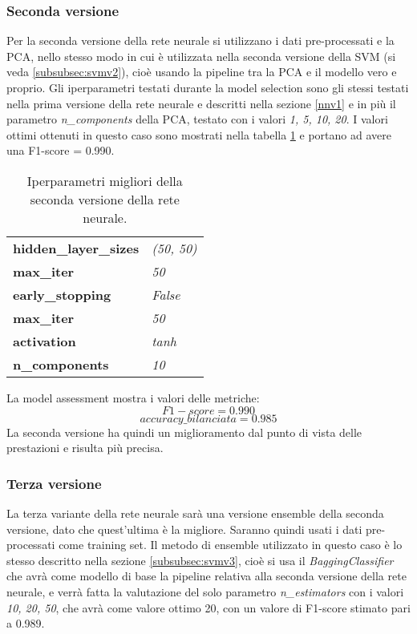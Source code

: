\subsubsection{Seconda versione}\label{nnv2}
Per la seconda versione della rete neurale si utilizzano i dati pre-processati e la PCA, nello stesso modo in cui è utilizzata nella seconda versione della SVM (si veda \ref{subsubsec:svmv2}), cioè usando la pipeline tra la PCA e il modello vero e proprio.  Gli iperparametri testati durante la model selection sono gli stessi testati nella prima versione della rete neurale e descritti nella sezione \ref{nnv1} e in più il parametro \textit{n\_components} della PCA, testato con i valori \textit{1, 5, 10, 20}. I valori ottimi ottenuti in questo caso sono mostrati nella tabella \ref{tab:nnv2} e portano ad avere una F1-score = 0.990.

\begin{table}[h] 
\centering
\begin{tabular}{l l}
\hline
\textbf{hidden\_layer\_sizes} & \textit{(50, 50)}\\
\textbf{max\_iter} & \textit{50}\\
\textbf{early\_stopping} & \textit{False}\\
\textbf{max\_iter} & \textit{50}\\
\textbf{activation} & \textit{tanh}\\
\textbf{n\_components} & \textit{10}\\
\hline
\end{tabular}
\caption{Iperparametri migliori della seconda versione della rete neurale.}
\label{tab:nnv2}
\end{table}

La model assessment mostra i valori delle metriche:
$$F1-score = 0.990$$
$$accuracy\_bilanciata = 0.985$$
La seconda versione ha quindi un miglioramento dal punto di vista delle prestazioni e risulta più precisa.

\subsubsection{Terza versione}\label{nnv3}
La terza variante della rete neurale sarà una versione ensemble della seconda versione, dato che quest'ultima è la migliore. Saranno quindi usati i dati pre-processati come training set. Il metodo di ensemble utilizzato in questo caso è lo stesso descritto nella sezione \ref{subsubsec:svmv3}, cioè si usa il \textit{BaggingClassifier} che avrà come modello di base la pipeline relativa alla seconda versione della rete neurale, e verrà fatta la valutazione del solo parametro \textit{n\_estimators} con i valori \textit{10, 20, 50}, che avrà come valore ottimo 20, con un valore di F1-score stimato pari a 0.989.

